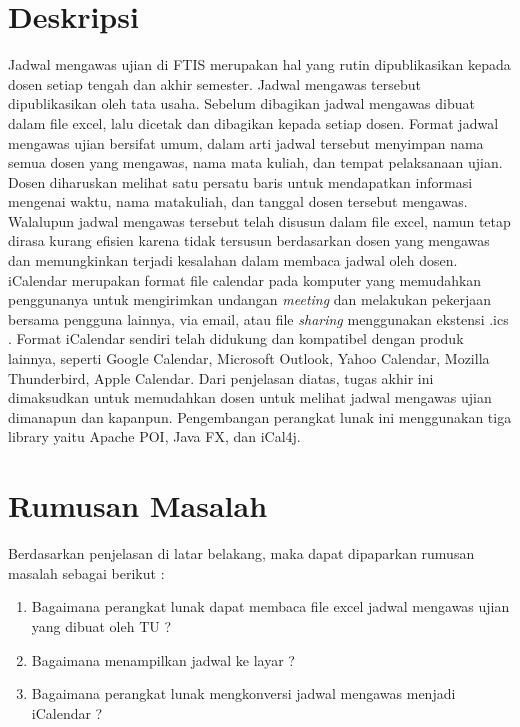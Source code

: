 \documentclass[a4paper,twoside]{article}
\begin{document}
\title{\@judultopik}
\author{\nama \textendash \@npm} 

\newcommand{\nama}{Ariq Rahmaeri}
\newcommand{\@npm}{2011730066}
\newcommand{\@judultopik}{Konversi Jadwal Mengawas Ujian Ke Format ICS dengan Apache POI, iCal4j, dan Java FX} %
\newcommand{\jumpemb}{1} %
\newcommand{\tanggal}{06/09/2016}


\maketitle


\section{Deskripsi}
\indent Jadwal mengawas ujian di FTIS merupakan hal yang rutin dipublikasikan kepada dosen setiap tengah dan akhir semester. Jadwal mengawas tersebut dipublikasikan oleh tata usaha. Sebelum dibagikan jadwal mengawas dibuat dalam file excel, lalu dicetak dan dibagikan kepada setiap dosen. Format jadwal mengawas ujian bersifat umum, dalam arti jadwal tersebut menyimpan nama semua dosen yang mengawas, nama mata kuliah, dan tempat pelaksanaan ujian. Dosen diharuskan melihat satu persatu baris untuk mendapatkan informasi mengenai waktu, nama matakuliah, dan tanggal dosen tersebut mengawas. Walalupun jadwal mengawas tersebut telah disusun dalam file excel, namun tetap dirasa kurang efisien karena tidak tersusun berdasarkan dosen yang mengawas dan memungkinkan terjadi kesalahan dalam membaca jadwal oleh dosen. 
iCalendar merupakan format file calendar pada komputer yang memudahkan penggunanya untuk mengirimkan undangan \textit{meeting} dan melakukan pekerjaan bersama pengguna lainnya, via email, atau file \textit{sharing} menggunakan ekstensi .ics . Format iCalendar sendiri telah didukung dan kompatibel dengan produk lainnya, seperti Google Calendar, Microsoft Outlook, Yahoo Calendar, Mozilla Thunderbird, Apple Calendar.
Dari penjelasan diatas, tugas akhir ini dimaksudkan untuk memudahkan dosen untuk melihat jadwal mengawas ujian dimanapun dan kapanpun. Pengembangan perangkat lunak ini menggunakan tiga library yaitu Apache POI, Java FX, dan iCal4j.    

\section{Rumusan Masalah}
Berdasarkan penjelasan di latar belakang, maka dapat dipaparkan rumusan masalah sebagai berikut :
\begin{enumerate}
	\item Bagaimana perangkat lunak dapat membaca file excel jadwal mengawas ujian yang dibuat oleh TU ?
	\item Bagaimana menampilkan jadwal ke layar ?
	\item Bagaimana perangkat lunak mengkonversi jadwal mengawas menjadi iCalendar ? 
\end{enumerate}
\end{document}

